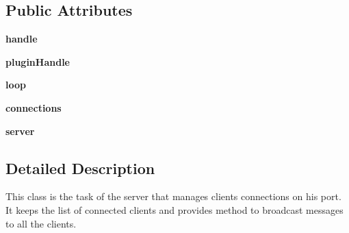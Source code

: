 \subsection*{\-Public \-Attributes}
\begin{DoxyCompactItemize}
\item 
\hypertarget{classnetwork_1_1_network_server_ac77241260be48a5d918ea939ca192b98}{{\bfseries handle}}\label{classnetwork_1_1_network_server_ac77241260be48a5d918ea939ca192b98}

\item 
\hypertarget{classnetwork_1_1_network_server_ad7de0342e1b2cc56f380c73a00b8f9d2}{{\bfseries plugin\-Handle}}\label{classnetwork_1_1_network_server_ad7de0342e1b2cc56f380c73a00b8f9d2}

\item 
\hypertarget{classnetwork_1_1_network_server_a2a835681d01d0203fc1af6bfe29f5c26}{{\bfseries loop}}\label{classnetwork_1_1_network_server_a2a835681d01d0203fc1af6bfe29f5c26}

\item 
\hypertarget{classnetwork_1_1_network_server_a4826937f5125b5213e8d8e201f8c0f2e}{{\bfseries connections}}\label{classnetwork_1_1_network_server_a4826937f5125b5213e8d8e201f8c0f2e}

\item 
\hypertarget{classnetwork_1_1_network_server_a46640d9244ace5f48262afc614f3acbc}{{\bfseries server}}\label{classnetwork_1_1_network_server_a46640d9244ace5f48262afc614f3acbc}

\end{DoxyCompactItemize}


\subsection{\-Detailed \-Description}
\begin{DoxyVerb}
This class is the task of the server that manages clients connections on
his port.  It keeps the list of connected clients and provides method to
broadcast messages to all the clients.
\end{DoxyVerb}
 

